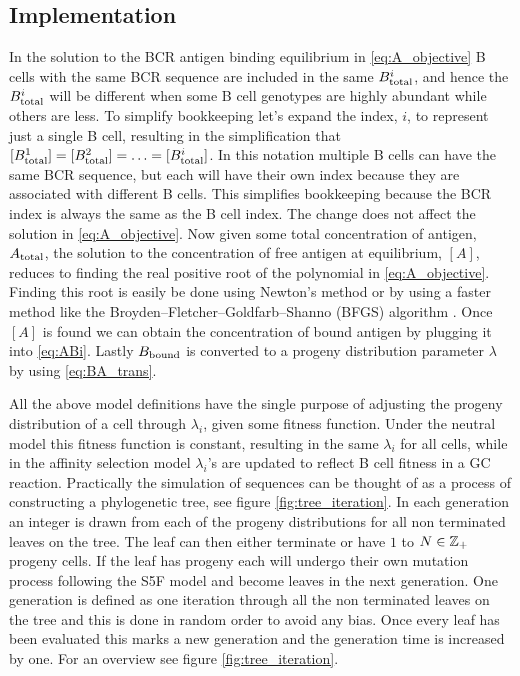 \subsection{Implementation}
In the solution to the BCR antigen binding equilibrium in \eqref{eq:A_objective} B cells with the same BCR sequence are included in the same $B^i_{\text{total}}$, and hence the $B^i_{\text{total}}$ will be different when some B cell genotypes are highly abundant while others are less.
To simplify bookkeeping let's expand the index, $i$, to represent just a single B cell, resulting in the simplification that $[B^1_{\text{total}}] = [B^2_{\text{total}}] = \ldots = [B^i_{\text{total}}]$.
In this notation multiple B cells can have the same BCR sequence, but each will have their own index because they are associated with different B cells.
This simplifies bookkeeping because the BCR index is always the same as the B cell index.
The change does not affect the solution in \eqref{eq:A_objective}.
Now given some total concentration of antigen, $A_{\text{total}}$, the solution to the concentration of free antigen at equilibrium, $[A]$, reduces to finding the real positive root of the polynomial in \eqref{eq:A_objective}.
Finding this root is easily be done using Newton's method or by using a faster method like the Broyden–Fletcher–Goldfarb–Shanno (BFGS) algorithm \cite{shanno1985broyden}.
Once $[A]$ is found we can obtain the concentration of bound antigen by plugging it into \eqref{eq:ABi}.
Lastly $B_{\text{bound}}$ is converted to a progeny distribution parameter $\lambda$ by using \eqref{eq:BA_trans}.

All the above model definitions have the single purpose of adjusting the progeny distribution of a cell through $\lambda_i$, given some fitness function.
Under the neutral model this fitness function is constant, resulting in the same $\lambda_i$ for all cells, while in the affinity selection model $\lambda_i$'s are updated to reflect B cell fitness in a GC reaction.
Practically the simulation of sequences can be thought of as a process of constructing a phylogenetic tree, see figure \ref{fig:tree_iteration}.
In each generation an integer is drawn from each of the progeny distributions for all non terminated leaves on the tree.
The leaf can then either terminate or have $1$ to $N \in \mathbb{Z}_+$ progeny cells.
If the leaf has progeny each will undergo their own mutation process following the S5F model and become leaves in the next generation.
One generation is defined as one iteration through all the non terminated leaves on the tree and this is done in random order to avoid any bias.
Once every leaf has been evaluated this marks a new generation and the generation time is increased by one.
For an overview see figure \ref{fig:tree_iteration}.


